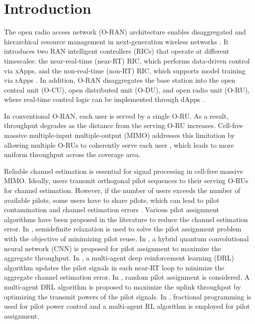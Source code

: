 \documentclass[10pt, conference]{IEEEtran}
\begin{document}
\section{Introduction}
The open radio access network (O-RAN) architecture enables disaggregated and hierarchical resource management in next-generation wireless networks \cite{survey:O-RAN1}. It introduces two RAN intelligent controllers (RICs) that operate at different timescales: the near-real-time (near-RT) RIC, which performs data-driven control via xApps, and the non-real-time (non-RT) RIC, which supports model training via rApps \cite{survey:O-RAN1}. In addition, O-RAN disaggregates the base station into the open central unit (O-CU), open distributed unit (O-DU), and open radio unit (O-RU), where real-time control logic can be implemented through dApps \cite{melodia:dApp_full}.

In conventional O-RAN, each user is served by a single O-RU. As a result, throughput degrades as the distance from the serving O-RU increases. Cell-free massive multiple-input multiple-output (MIMO) addresses this limitation by allowing multiple O-RUs to coherently serve each user \cite{Bjornson:CF-mMIMO}, which leads to more uniform throughput across the coverage area.

Reliable channel estimation is essential for signal processing in cell-free massive MIMO. Ideally, users transmit orthogonal pilot sequences to their serving O-RUs for channel estimation. However, if the number of users exceeds the number of available pilots, some users have to share pilots, which can lead to pilot contamination and channel estimation errors \cite{MIMO:pilot1}. Various pilot assignment algorithms have been proposed in the literature to reduce the channel estimation error.
In \cite{MIMO:pilot_approx_ratio}, semidefinite relaxation is used to solve the pilot assignment problem with the objective of minimizing pilot reuse.
In \cite{MIMO:pilot_quantum}, a hybrid quantum convolutional neural network (CNN) is proposed for pilot assignment to maximize the aggregate throughput.
In \cite{MIMO:pilot1}, a multi-agent deep reinforcement learning (DRL) algorithm updates the pilot signals in each near-RT loop to minimize the aggregate channel estimation error.
In \cite{MIMO:pilot_power}, random pilot assignment is considered. A multi-agent DRL algorithm is proposed to maximize the uplink throughput by optimizing the transmit powers of the pilot signals.
In \cite{MIMO:pilot_power2}, fractional programming is used for pilot power control and a multi-agent RL algorithm is employed for pilot assignment. 
\end{document}
